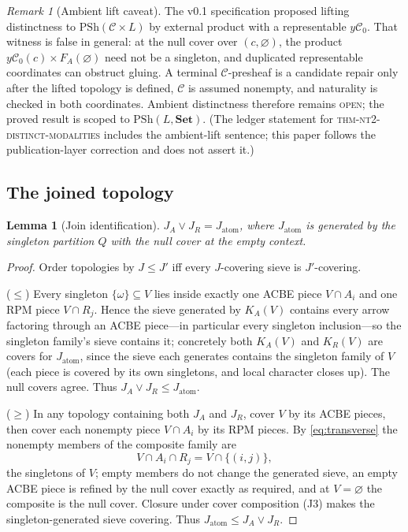 \documentclass[11pt]{amsart}
\newtheorem{lemma}[theorem]{Lemma}
\theoremstyle{definition}
\theoremstyle{remark}
\newtheorem{remark}[theorem]{Remark}
\newcommand{\PSh}{\mathrm{PSh}}
\newcommand{\Set}{\mathbf{Set}}
\newcommand{\cC}{\mathcal{C}}
\begin{document}
\begin{remark}[Ambient lift caveat]\label{rem:ambientlift}
The v0.1 specification proposed lifting distinctness to $\PSh(\cC\times L)$ by external product with a representable $y\cC_0$. That witness is false in general: at the null cover over $(c,\varnothing)$, the product $y\cC_0(c)\times F_A(\varnothing)$ need not be a singleton, and duplicated representable coordinates can obstruct gluing. A terminal $\cC$-presheaf is a candidate repair only after the lifted topology is defined, $\cC$ is assumed nonempty, and naturality is checked in both coordinates. Ambient distinctness therefore remains \textsc{open}; the proved result is scoped to $\PSh(L,\Set)$. (The ledger statement for \textsc{thm-nt2-distinct-modalities} includes the ambient-lift sentence; this paper follows the publication-layer correction and does not assert it.)
\end{remark}

\subsection{The joined topology}

\begin{lemma}[Join identification]\label{lem:join}
$J_A\vee J_R=J_{\mathrm{atom}}$, where $J_{\mathrm{atom}}$ is generated by the singleton partition $Q$ with the null cover at the empty context.
\end{lemma}

\begin{proof}
Order topologies by $J\le J'$ iff every $J$-covering sieve is $J'$-covering.

($\le$) Every singleton $\{\omega\}\subseteq V$ lies inside exactly one ACBE piece $V\cap A_i$ and one RPM piece $V\cap R_j$. Hence the sieve generated by $K_A(V)$ contains every arrow factoring through an ACBE piece---in particular every singleton inclusion---so the singleton family's sieve contains it; concretely both $K_A(V)$ and $K_R(V)$ are covers for $J_{\mathrm{atom}}$, since the sieve each generates contains the singleton family of $V$ (each piece is covered by its own singletons, and local character closes up). The null covers agree. Thus $J_A\vee J_R\le J_{\mathrm{atom}}$.

($\ge$) In any topology containing both $J_A$ and $J_R$, cover $V$ by its ACBE pieces, then cover each nonempty piece $V\cap A_i$ by its RPM pieces. By \eqref{eq:transverse} the nonempty members of the composite family are
\[
V\cap A_i\cap R_j = V\cap\{(i,j)\},
\]
the singletons of $V$; empty members do not change the generated sieve, an empty ACBE piece is refined by the null cover exactly as required, and at $V=\varnothing$ the composite is the null cover. Closure under cover composition (J3) makes the singleton-generated sieve covering. Thus $J_{\mathrm{atom}}\le J_A\vee J_R$.
\end{proof}
\end{document}
